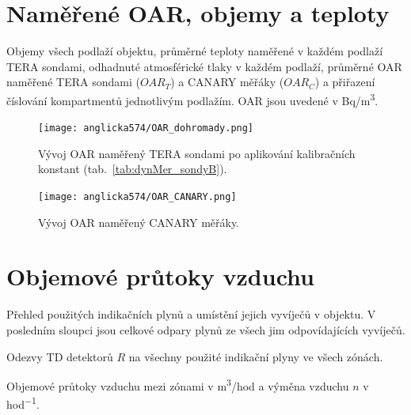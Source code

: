 \section{Naměřené OAR, objemy a teploty}

\begin{table}[H]
    \centering
    \caption{Objemy všech podlaží objektu, průměrné teploty naměřené v každém podlaží TERA sondami, odhadnuté atmosférické tlaky v každém podlaží, průměrné OAR naměřené TERA sondami ($OAR_T$) a CANARY měřáky ($OAR_C$) a přiřazení číslování kompartmentů jednotlivým podlažím. OAR jsou uvedené v \si{Bq/m^3}.}
    \label{tab:anglicka574_objemy}
    
\end{table}
\begin{figure}[H]
    \centering
    \texttt{[image: anglicka574/OAR\_dohromady.png]}
    \caption{Vývoj OAR naměřený TERA sondami po aplikování kalibračních konstant (tab.~\ref{tab:dynMer_sondyB}).}
    \label{fig:anglicka574_OAR_dohromady}
\end{figure}
\begin{figure}[H]
    \centering
    \texttt{[image: anglicka574/OAR\_CANARY.png]}
    \caption{Vývoj OAR naměřený CANARY měřáky.}
    \label{fig:anglicka574_OAR_CANARY}
\end{figure}

\section{Objemové průtoky vzduchu}

\begin{table}[H]
    \centering
    \caption{Přehled použitých indikačních plynů a umístění jejich vyvíječů v objektu. V posledním sloupci jsou celkové odpary plynů ze všech jim odpovídajících vyvíječů.}
    \label{tab:anglicka574_indikacniPlyny}
    
\end{table}
\begin{table}[H]
    \centering
    \caption{Odezvy TD detektorů $R$ na všechny použité indikační plyny ve všech zónách.}
    \label{tab:anglicka574_odezvyTD}
    
\end{table}

\begin{table}[H]
    \centering
    \caption{Objemové průtoky vzduchu mezi zónami v \si{m^3/hod} a výměna vzduchu $n$ v \si{hod^{-1}}.}
    \label{tab:anglicka574_prutoky}
    
\end{table}


